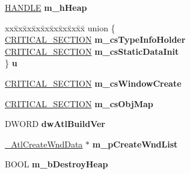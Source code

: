 \begin{DoxyCompactItemize}
\hyperlink{interfacevoid}{H\+A\+N\+D\+LE} {\bfseries m\+\_\+h\+Heap}
\item 
\mbox{\label{struct___a_t_l___m_o_d_u_l_e_a___t_a_g_a7071713c0aef55d275a50e973be2c942}} 
\begin{tabbing}
xx\=xx\=xx\=xx\=xx\=xx\=xx\=xx\=xx\=\kill
union \{\\
\>\hyperlink{struct___c_r_i_t_i_c_a_l___s_e_c_t_i_o_n}{CRITICAL\_SECTION} {\bfseries m\_csTypeInfoHolder}\\
\>\hyperlink{struct___c_r_i_t_i_c_a_l___s_e_c_t_i_o_n}{CRITICAL\_SECTION} {\bfseries m\_csStaticDataInit}\\
\} {\bfseries u}\\

\end{tabbing}\item 
\mbox{\label{struct___a_t_l___m_o_d_u_l_e_a___t_a_g_ab6daf4de76c8a0605904bc50a976d260}} 
\hyperlink{struct___c_r_i_t_i_c_a_l___s_e_c_t_i_o_n}{C\+R\+I\+T\+I\+C\+A\+L\+\_\+\+S\+E\+C\+T\+I\+ON} {\bfseries m\+\_\+cs\+Window\+Create}
\item 
\mbox{\label{struct___a_t_l___m_o_d_u_l_e_a___t_a_g_a7ffa2b45342b433417bb00a7d568ce60}} 
\hyperlink{struct___c_r_i_t_i_c_a_l___s_e_c_t_i_o_n}{C\+R\+I\+T\+I\+C\+A\+L\+\_\+\+S\+E\+C\+T\+I\+ON} {\bfseries m\+\_\+cs\+Obj\+Map}
\item 
\mbox{\label{struct___a_t_l___m_o_d_u_l_e_a___t_a_g_af8ba383d6c3b7e71c6d4bb310ac05204}} 
D\+W\+O\+RD {\bfseries dw\+Atl\+Build\+Ver}
\item 
\mbox{\label{struct___a_t_l___m_o_d_u_l_e_a___t_a_g_a8e447a5fd9d93eb4f3671f431cc82ccc}} 
\hyperlink{struct___atl_create_wnd_data___t_a_g}{\+\_\+\+Atl\+Create\+Wnd\+Data} $\ast$ {\bfseries m\+\_\+p\+Create\+Wnd\+List}
\item 
\mbox{\label{struct___a_t_l___m_o_d_u_l_e_a___t_a_g_adb31c3f45ad439e38dcc90824d2e6f08}} 
B\+O\+OL {\bfseries m\+\_\+b\+Destroy\+Heap}
\item 
\mbox{\label{struct___a_t_l___m_o_d_u_l_e_a___t_a_g_ad28182e7075e0d60edfc7e4062d0c3b5}} 

\end{DoxyCompactItemize}
